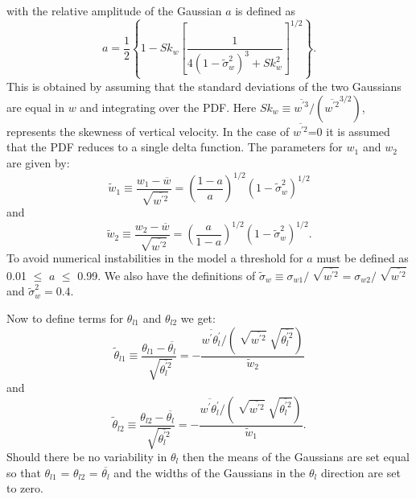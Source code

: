 %
with the relative amplitude of the Gaussian $a$ is defined as
%
\begin{equation}
  a=\frac{1}{2}\left\{1-Sk_{w}\left[\frac{1}{4(1-\tilde{\sigma}_{w}^{2})^{3}+Sk_{w}^{2}}\right]^{1/2}\right\}.
  \label{adg_a}
\end{equation}
%
This is obtained by assuming that the standard deviations of the two Gaussians are equal in $w$ and integrating over the PDF.  Here $Sk_{w}\equiv \overline{w^{'3}}/(\overline{w^{'2}}^{3/2})$, represents the skewness of vertical velocity.  In the case of $\overline{w^{'2}}$=0 it is assumed that the PDF reduces to a single delta function.  The parameters for $w_{1}$ and $w_{2}$ are given by:
%
\begin{equation}
  \tilde{w}_{1}\equiv\frac{w_{1}-\overline{w}}{\sqrt[]{\overline{w^{'2}}}}=\left(\frac{1-a}{a}\right)^{1/2}(1-\tilde{\sigma}_{w}^{2})^{1/2}
  \label{tildew_1}
\end{equation}
%
and
%
\begin{equation}
  \tilde{w}_{2}\equiv\frac{w_{2}-\overline{w}}{\sqrt[]{\overline{w^{'2}}}}=\left(\frac{a}{1-a}\right)^{1/2}(1-\tilde{\sigma}_{w}^{2})^{1/2} . 
  \label{tildew_2}
\end{equation}
%
To avoid numerical instabilities in the model a threshold for $a$ must be defined as 0.01 $\le$ $a$ $\le$ 0.99.  We also have the definitions of $\tilde{\sigma}_{w}\equiv\sigma_{w1}/ \sqrt[]{\overline{w^{'2}}} = \sigma_{w2}/\sqrt[]{\overline{w^{'2}}}$ and $\tilde{\sigma}_{w}^{2}=0.4$.  

Now to define terms for $\theta_{l1}$ and $\theta_{l2}$ we get:
%
\begin{equation}
  \tilde{\theta}_{l1}\equiv\frac{\theta_{l1}-\overline{\theta_{l}}}{\sqrt[]{\overline{\theta_{l}^{'2}}}}=-\frac{\overline{w^{'}\theta_{l}^{'}}/(\sqrt[]{\overline{w^{'2}}}\sqrt[]{\overline{\theta_{l}^{'2}}})}{\tilde{w}_{2}}
  \label{tildethl_1}
\end{equation}
%
and
%
\begin{equation}
  \tilde{\theta}_{l2}\equiv\frac{\theta_{l2}-\overline{\theta_{l}}}{\sqrt[]{\overline{\theta_{l}^{'2}}}}=-\frac{\overline{w^{'}\theta_{l}^{'}}/(\sqrt[]{\overline{w^{'2}}}\sqrt[]{\overline{\theta_{l}^{'2}}})}{\tilde{w}_{1}} .  
  \label{tildethl_2}
\end{equation}
%
Should there be no variability in $\theta_{l}$ then the means of the Gaussians are set equal so that $\theta_{l1}$ = $\theta_{l2}$ = $\overline{\theta_{l}}$ and the widths of the Gaussians in the $\theta_{l}$ direction are set to zero.  

